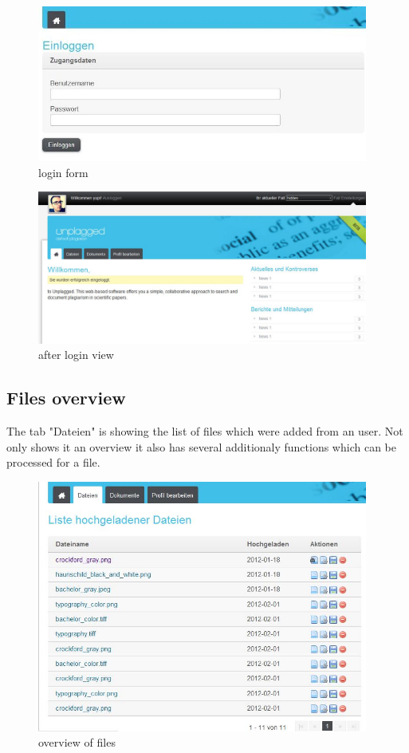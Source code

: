 \begin{figure}[!ht]
  \centering
    \includegraphics[width=0.97\textwidth]{images/basic_functionalities/login_form.jpg}
  \caption{login form}
  \label{fig:einloggen}
\end{figure}

\begin{figure}[!ht]
  \centering
    \includegraphics[width=0.97\textwidth]{images/basic_functionalities/after_login.jpg}
  \caption{after login view}
  \label{fig:einloggen}
\end{figure}
\subsection{Files overview}
The tab "Dateien" is showing the list of files which were added from an user. Not only shows it an overview it also has several additionaly functions which can be processed for a file.
\begin{figure}[!ht]
  \centering
    \includegraphics[width=0.97\textwidth]{images/basic_functionalities/dateien.jpg}
  \caption{overview of files}
  \label{fig:einloggen}
\end{figure}
